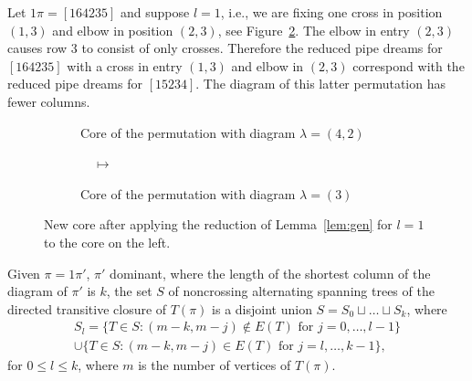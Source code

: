 \documentclass[ALCO,ThmDefs]{cedram}
\numberwithin{equation}{section}
\newcommand{\lmp}[1]{\mathrel{\mathop{\longmapsto}^{#1}}}
\newcommand*\+{\smash{\lower2pt\hbox{\rlap{\vrule height14pt}}\raise2pt\hbox{\rlap{\hskip-3pt \vrule height.4pt depth0pt width14.7pt}}}}
\newcommand*\textcross{\ \smash{\lower4pt\hbox{\rlap{\hskip4.15pt\vrule height14pt}}\raise2.8pt\hbox{\rlap{\hskip-3pt \vrule height.4pt depth0pt width14.7pt}}}\hskip12.7pt}
\newcommand*\textelbow{\ \hskip.1pt\smash{\raise2.8pt\hbox{\co \hskip 4.15pt\rlap{\rlap{\char'005} \char'007}\lower6.8pt\rlap{\vrule height3.5pt}\raise3.6pt\rlap{\vrule height3.5pt}}\raise2.8pt\hbox{\rlap{\hskip-7.15pt \vrule height.4pt depth0pt width3.5pt}\rlap{\hskip4.05pt \vrule height.4pt depth0pt width3.5pt}}}\hskip8.7pt}
\begin{document}
\begin{exam} Let $1\pi=[164235]$ and suppose $l=1$, i.e., we are fixing one cross in position $(1,3)$ and elbow in position $(2,3)$, see Figure~\ref{ex:fixelb}. The elbow in entry $(2,3)$ causes row 3 to consist of only crosses. Therefore the reduced pipe dreams for $[164235]$ with a cross in entry $(1,3)$ and elbow in $(2,3)$ correspond with the reduced pipe dreams for $[15234]$. The diagram of this latter permutation has fewer columns.

\begin{figure}[h]
\centering
\begin{subfigure}[h]{0.35\textwidth}
\centering
{}
\caption{Core of the permutation with diagram $\lambda=(4,2)$}\label{fig:y equals x}
\end{subfigure}
\begin{subfigure}[h]{0.1\textwidth}
\centering $\quad\displaystyle{\lmp{}}\quad$
\end{subfigure}
\begin{subfigure}[h]{0.35\textwidth}
\centering
\vspace{0.7em}
\vspace{0.7em}
\caption{Core of the permutation with diagram $\lambda=(3)$}
\end{subfigure}
\caption{New core after applying the reduction of Lemma~\ref{lem:gen} for $l=1$ to the core on the left.} \label{ex:fixelb}
\end{figure}
\end{exam}

\begin{lemm}\label{lem:S}
Given $\pi=1\pi'$, $\pi'$ dominant, where the length of the shortest column of the diagram of $\pi'$ is $k$, the set $S$ of noncrossing alternating spanning trees of the directed transitive closure of $T(\pi)$ is a disjoint union $S=S_0\sqcup \dots \sqcup S_{k}$, where
\begin{multline}
S_l=\{T\in S : (m-k,m-j)\notin E(T) \text{ for } j=0,\dots,l-1\}\\
\cup \{T\in S : (m-k,m-j)\in E(T) \text{ for } j=l,\dots,k-1\},
\end{multline}
for $0\leq l\leq k$, where $m$ is the number of vertices of $T(\pi)$.
\end{lemm}
\end{document}
